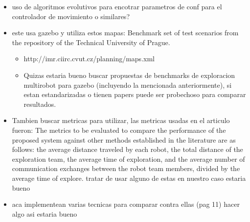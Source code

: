 \begin{itemize}
\item uso de algoritmos evolutivos para encotrar parametros de conf para el controlador de movimiento o similares?

\item este usa gazebo y utiliza estos mapas: Benchmark set of test scenarios from the repository of the Technical University of Prague.
\begin{itemize}
  \item http://imr.ciirc.cvut.cz/planning/maps.xml
  \item Quizas estaria bueno buscar propuestas de benchmarks de exploracion multirobot para gazebo (incluyendo la mencionada anteriormente), si estan estandarizadas o tienen papers puede ser probechoso para comparar resultados.
\end{itemize}

\item Tambien buscar metricas para utilizar, las metricas usadas en el articulo fueron: The metrics to be evaluated to compare the performance of the proposed system against other methods established in the literature are as follows: the average distance traveled by each robot, the total distance of the exploration team, the average time of exploration, and the average number of communication exchanges between the robot team members, divided by the average time of explore. tratar de usar alguno de estas en nuestro caso estaria bueno

\item aca implementean varias tecnicas para comparar contra ellas (pag 11) hacer algo asi estaria bueno
\end{itemize}

